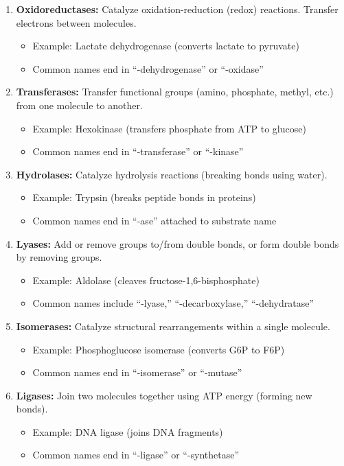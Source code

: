 \begin{enumerate}[label=\arabic*.]
    \item \textbf{Oxidoreductases:} Catalyze oxidation-reduction (redox) reactions. Transfer electrons between molecules.
    \begin{itemize}
        \item Example: Lactate dehydrogenase (converts lactate to pyruvate)
        \item Common names end in ``-dehydrogenase'' or ``-oxidase''
    \end{itemize}
    
    \item \textbf{Transferases:} Transfer functional groups (amino, phosphate, methyl, etc.) from one molecule to another.
    \begin{itemize}
        \item Example: Hexokinase (transfers phosphate from ATP to glucose)
        \item Common names end in ``-transferase'' or ``-kinase''
    \end{itemize}
    
    \item \textbf{Hydrolases:} Catalyze hydrolysis reactions (breaking bonds using water).
    \begin{itemize}
        \item Example: Trypsin (breaks peptide bonds in proteins)
        \item Common names end in ``-ase'' attached to substrate name
    \end{itemize}
    
    \item \textbf{Lyases:} Add or remove groups to/from double bonds, or form double bonds by removing groups.
    \begin{itemize}
        \item Example: Aldolase (cleaves fructose-1,6-bisphosphate)
        \item Common names include ``-lyase,'' ``-decarboxylase,'' ``-dehydratase''
    \end{itemize}
    
    \item \textbf{Isomerases:} Catalyze structural rearrangements within a single molecule.
    \begin{itemize}
        \item Example: Phosphoglucose isomerase (converts G6P to F6P)
        \item Common names end in ``-isomerase'' or ``-mutase''
    \end{itemize}
    
    \item \textbf{Ligases:} Join two molecules together using ATP energy (forming new bonds).
    \begin{itemize}
        \item Example: DNA ligase (joins DNA fragments)
        \item Common names end in ``-ligase'' or ``-synthetase''
    \end{itemize}
\end{enumerate}


